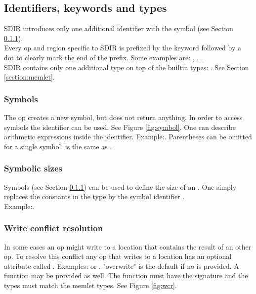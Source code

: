 \subsection{Identifiers, keywords and types}
SDIR introduces only one additional identifier with the symbol \codeword{\$} (see Section \ref{section:symbol}).\\
Every op and region specific to SDIR is prefixed by the keyword  followed by a dot to clearly mark the end of the prefix. Some examples are: , , . \\
SDIR contains only one additional type on top of the builtin types: . See Section \ref{section:memlet}. 

\subsubsection{Symbols} \label{section:symbol}
The op  creates a new symbol, but does not return anything. In order to access symbols the identifier \codeword{\$()} can be used. See Figure \ref{fig:symbol}. One can describe arithmetic expressions inside the identifier. Example:. Parentheses can be omitted for a single symbol.  is the same as .

 \subsubsection{Symbolic sizes}
 Symbols (see Section \ref{section:symbol}) can be used to define the size of an . One simply replaces the constants in the type by the symbol identifier \codeword{\$()}.\\
 Example:.
 
 \subsubsection{Write conflict resolution}
In some cases an op might write to a location that contains the result of an other op. To resolve this conflict any op that writes to a location has an optional attribute called . Examples: or . "overwrite" is the default if no  is provided. A function may be provided as well. The function must have the signature  and the types must match the memlet types. See Figure \ref{fig:wcr}.

